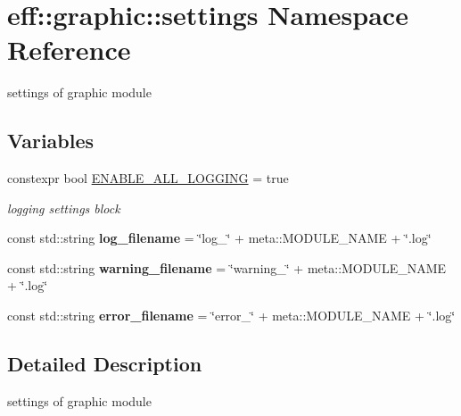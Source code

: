 \hypertarget{namespaceeff_1_1graphic_1_1settings}{}\section{eff\+:\+:graphic\+:\+:settings Namespace Reference}
\label{namespaceeff_1_1graphic_1_1settings}


settings of graphic module  


\subsection*{Variables}
\begin{DoxyCompactItemize}
\item 
\mbox{\label{namespaceeff_1_1graphic_1_1settings_a31226318c731d54d7d122a78bd2f8f1d}} 
constexpr bool \hyperlink{namespaceeff_1_1graphic_1_1settings_a31226318c731d54d7d122a78bd2f8f1d}{E\+N\+A\+B\+L\+E\+\_\+\+A\+L\+L\+\_\+\+L\+O\+G\+G\+I\+NG} = true
\begin{DoxyCompactList}\small\item\em logging settings block \end{DoxyCompactList}\item 
\mbox{\label{namespaceeff_1_1graphic_1_1settings_a8808cea5ab1aed2226eae8cd0af5a70b}} 
const std\+::string {\bfseries log\+\_\+filename} = \char`\"{}log\+\_\+\char`\"{} + meta\+::\+M\+O\+D\+U\+L\+E\+\_\+\+N\+A\+ME + \char`\"{}.log\char`\"{}
\item 
\mbox{\label{namespaceeff_1_1graphic_1_1settings_afa82b54e602c80f352b23e0a40a57db0}} 
const std\+::string {\bfseries warning\+\_\+filename} = \char`\"{}warning\+\_\+\char`\"{} + meta\+::\+M\+O\+D\+U\+L\+E\+\_\+\+N\+A\+ME + \char`\"{}.log\char`\"{}
\item 
\mbox{\label{namespaceeff_1_1graphic_1_1settings_ac4c5fda882abc7d6fa0957d92172b3ed}} 
const std\+::string {\bfseries error\+\_\+filename} = \char`\"{}error\+\_\+\char`\"{} + meta\+::\+M\+O\+D\+U\+L\+E\+\_\+\+N\+A\+ME + \char`\"{}.log\char`\"{}
\end{DoxyCompactItemize}


\subsection{Detailed Description}
settings of graphic module 